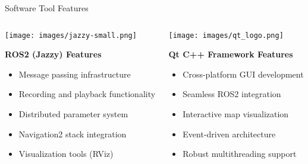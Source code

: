 \documentclass[aspectratio=169]{beamer}
\newcommand{\reducefontsize}{\fontsize{7}{9}\selectfont}
\begin{document}
\begin{frame}{Software Tool Features}
  {\reducefontsize
    \begin{columns}
      \begin{column}{0.45\textwidth}
        \begin{center}
          \texttt{[image: images/jazzy-small.png]}
        \end{center}
        \textbf{ROS2 (Jazzy) Features}
        \begin{itemize}
        \item Message passing infrastructure
        \item Recording and playback functionality
        \item Distributed parameter system
        \item Navigation2 stack integration
        \item Visualization tools (RViz)
        \end{itemize}
      \end{column}
      \begin{column}{0.45\textwidth}
        \begin{center}
          \texttt{[image: images/qt\_logo.png]}
        \end{center}
        \textbf{Qt C++ Framework Features}
        \begin{itemize}
        \item Cross-platform GUI development
        \item Seamless ROS2 integration
        \item Interactive map visualization
        \item Event-driven architecture
        \item Robust multithreading support
        \end{itemize}
      \end{column}
    \end{columns}
    
}
\end{frame}
\end{document}
